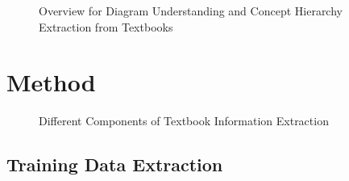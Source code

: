 \documentclass{article} %
\begin{document}
\begin{figure}[t]
\centering
{}
\caption{Overview for Diagram Understanding and Concept Hierarchy Extraction from Textbooks}
\label{fig:related-works}
\end{figure}

\section{Method}

\begin{figure}[H]
\centering
{}
\caption{Different Components of Textbook Information Extraction}
\label{fig:process}
\end{figure}

\subsection{Training Data Extraction}
\end{document}
